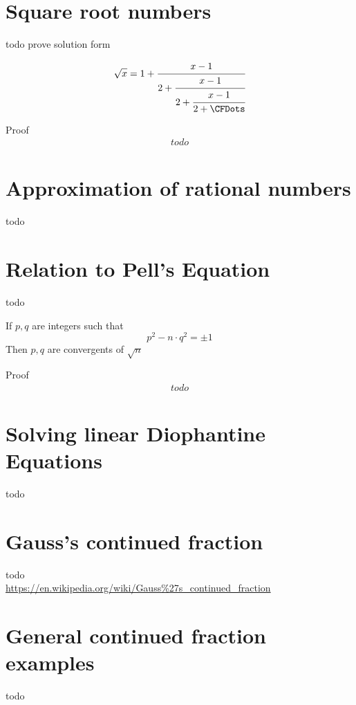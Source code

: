 \documentclass[a4paper]{article}
\begin{document}
    \section{Square root numbers}\label{sec:square-root-numbers}
    todo prove solution form

    \begin{theorem}
        \[
        \sqrt{x} = 1 + \cfrac{x-1}{2 +\cfrac{x-1}{2 +\cfrac{x-1}{2 + \CFDots}}}
        \]

        Proof
        \begin{gather*}
            todo
        \end{gather*}
    \end{theorem}


    \section{Approximation of rational numbers}\label{sec:approximation-of-rational-numbers}
    todo


    \section{Relation to Pell's Equation}\label{sec:relation-to-pell's-equation}
    todo

    \begin{theorem}
        If $p,q$ are integers such that
        \[
        p^2 - n \cdot q^2 =  \pm 1
        \]
        Then $p,q$ are convergents of $\sqrt{n}$

        Proof
        \begin{gather*}
            todo
        \end{gather*}
    \end{theorem}


    \section{Solving linear Diophantine Equations}\label{sec:solving-linear-diophantine-equations}
    todo


    \section{Gauss's continued fraction}\label{sec:gauss's-continued-fraction}
    todo \\
    \url{https://en.wikipedia.org/wiki/Gauss%27s_continued_fraction}


    \section{General continued fraction examples}
    todo
\end{document}
